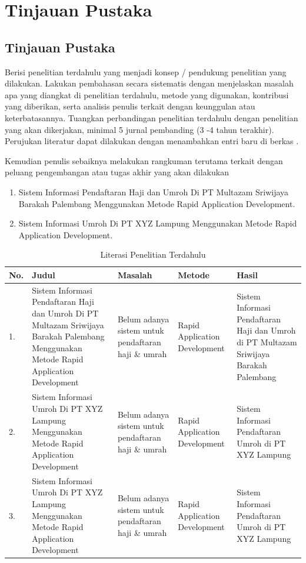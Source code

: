 \newpage
\chapter{Tinjauan Pustaka} \label{Bab II}

\section{Tinjauan Pustaka} \label{II.Tinjauan}
Berisi penelitian terdahulu yang menjadi konsep / pendukung penelitian yang dilakukan. Lakukan pembahasan secara sistematis dengan menjelaskan masalah apa yang diangkat di penelitian terdahulu, metode yang digunakan, kontribusi yang diberikan, serta analisis penulis terkait dengan keunggulan atau keterbatasannya. Tuangkan perbandingan penelitian terdahulu dengan penelitian yang akan dikerjakan, minimal 5 jurnal pembanding (3 -4 tahun terakhir). Perujukan literatur dapat dilakukan dengan menambahkan entri baru di berkas \cite{knuth2001art}. \par

Kemudian penulis sebaiknya melakukan rangkuman terutama terkait dengan peluang pengembangan atau tugas akhir yang akan dilakukan \par

\begin{enumerate}
	\item Sistem Informasi Pendaftaran Haji dan Umroh Di PT Multazam Sriwijaya Barakah Palembang Menggunakan Metode Rapid Application Development. \blindtext
	\item Sistem Informasi Umroh Di PT XYZ Lampung Menggunakan Metode Rapid Application Development. \blindtext
\end{enumerate}

\begin{longtable}{| b{}|p{}|p{}|p{}|p{}|} %
	\caption{Literasi Penelitian Terdahulu}
	\label{table:2.literasi}\\
	\hline
	No. & Judul & Masalah & Metode & Hasil \\
	\hline
	\endhead %
	1. & Sistem Informasi Pendaftaran Haji dan Umroh Di PT Multazam Sriwijaya Barakah Palembang Menggunakan Metode Rapid Application Development & Belum adanya sistem untuk pendaftaran haji \& umrah & Rapid Application Development & Sistem Informasi Pendaftaran Haji dan Umroh di PT Multazam Sriwijaya Barakah Palembang\\ 
	\hline
	2. & Sistem Informasi Umroh Di PT XYZ Lampung Menggunakan Metode Rapid Application Development & Belum adanya sistem untuk pendaftaran haji \& umrah & Rapid Application Development & Sistem Informasi Pendaftaran Umroh di PT XYZ Lampung\\ 
	\hline
	3. & Sistem Informasi Umroh Di PT XYZ Lampung Menggunakan Metode Rapid Application Development & Belum adanya sistem untuk pendaftaran haji \& umrah & Rapid Application Development & Sistem Informasi Pendaftaran Umroh di PT XYZ Lampung\\ 
	\hline
\end{longtable}

